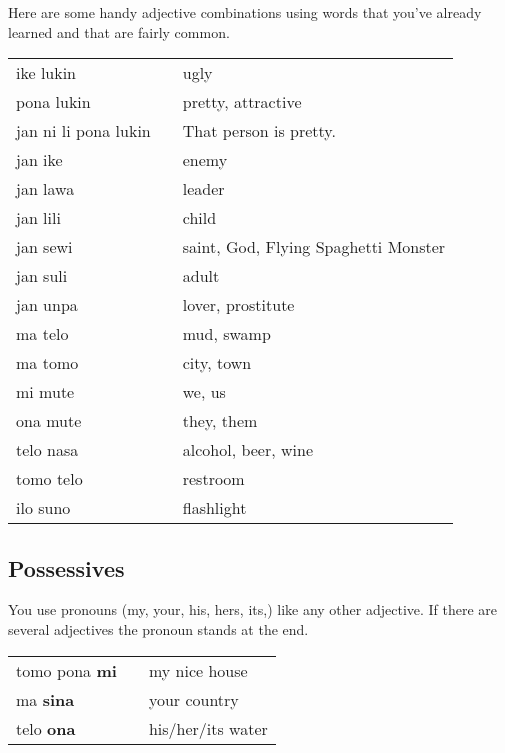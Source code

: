 Here are some handy adjective combinations using words that you've already learned and that are fairly common.

\begin{supertabular}{p{5,5cm}|ll}
ike lukin && ugly  \\
pona lukin && pretty, attractive \\
jan ni li pona lukin && That person is pretty. \\
jan ike && enemy \\
jan lawa && leader \\
jan lili && child \\
jan sewi && saint, God, Flying Spaghetti Monster \\
jan suli && adult \\
jan unpa && lover, prostitute \\
ma telo && mud, swamp \\
ma tomo && city, town \\
mi mute && we, us \\
ona mute && they, them \\
telo nasa && alcohol, beer, wine \\
tomo telo && restroom \\
ilo suno && flashlight \\ 
\end{supertabular} 
 
\subsection*{Possessives}

You use pronouns (my, your, his, hers, its,) like any other adjective. 
If there are several adjectives the pronoun stands at the end.

\begin{supertabular}{p{5,5cm}|ll}
tomo pona \textbf{mi} && my nice house \\
ma \textbf{sina} && your country \\
telo \textbf{ona} && his/her/its water \\
\end{supertabular} 

